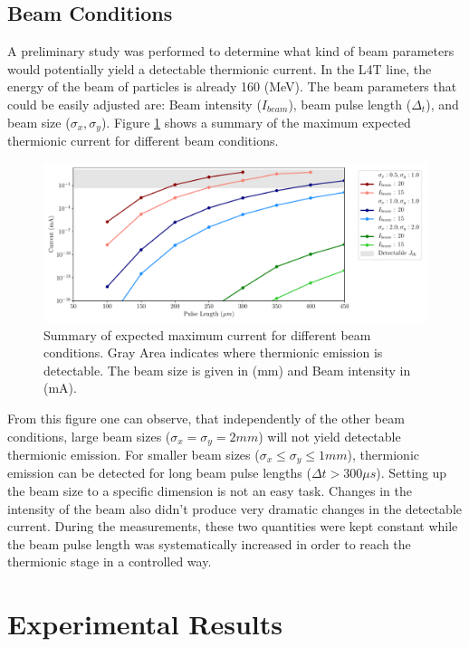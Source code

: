 \subsection{Beam Conditions}

A preliminary study was performed to determine what kind of beam parameters would potentially yield a detectable thermionic current. In the L4T line, the energy of the \hm beam of particles is already 160 (MeV). The beam parameters that could be easily adjusted are: Beam intensity ($I_{beam}$), beam pulse length ($\Delta_t$), and beam size ($\sigma_x , \sigma_y$). Figure \ref{fig:Jth_Cond} shows a summary of the maximum expected thermionic current for different beam conditions. 

\begin{figure}[h]
    \centering
    \includegraphics[width=0.90\columnwidth]{Figure_IsThereThermo/IsThereThermo.pdf}
    \caption{Summary of expected maximum current for different beam conditions. Gray Area indicates where thermionic emission is detectable. The beam size is given in (mm) and Beam intensity in (mA).}
    \label{fig:Jth_Cond}
\end{figure}

From this figure one can observe, that independently of the other beam conditions, large beam sizes ($\sigma_x = \sigma_y = 2 mm$) will not yield detectable thermionic emission. For smaller beam sizes ($\sigma_x \leq \sigma_y \leq 1 mm$), thermionic emission can be detected for long beam pulse lengths ($\Delta t > 300 \mu s$). Setting up the beam size to a specific dimension is not an easy task. Changes in the intensity of the beam also didn't produce very dramatic changes in the detectable current. During the measurements, these two quantities were kept constant while the beam pulse length was systematically increased in order to reach the thermionic stage in a controlled way. 

\section{Experimental Results}


